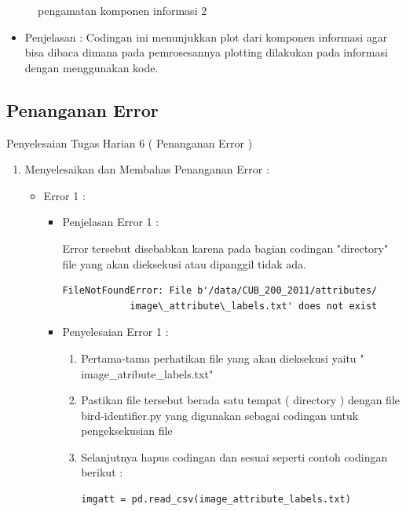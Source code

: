 \begin{enumerate}
\begin{itemize}
\begin{figure}[ht]
\caption{pengamatan komponen informasi 2}
\label{contoh}
\end{figure}
\par
\begin{itemize}
\item Penjelasan : Codingan ini menunjukkan plot dari komponen informasi agar bisa dibaca dimana pada pemrosesannya plotting dilakukan pada informasi dengan menggunakan kode.
\par
\par
\end{itemize}
\end{itemize}


\par
\par
\subsection{Penanganan Error}
Penyelesaian Tugas Harian 6 ( Penanganan Error )
\begin{enumerate}
\item Menyelesaikan dan Membahas Penanganan Error :
\begin{itemize}
\item Error 1 :
\par 
\par
\begin{itemize}
\item Penjelasan Error 1 :
\par Error tersebut disebabkan karena pada bagian codingan "directory" file yang akan dieksekusi atau dipanggil tidak ada.
\begin{lstlisting}
FileNotFoundError: File b'/data/CUB_200_2011/attributes/
			image\_attribute\_labels.txt' does not exist
\end{lstlisting}
\item Penyelesaian Error 1 :
\begin{enumerate}
\item Pertama-tama perhatikan file yang akan dieksekusi yaitu " image\_atribute\_labels.txt" 
\item Pastikan file tersebut berada satu tempat ( directory ) dengan file bird-identifier.py yang digunakan sebagai codingan untuk pengeksekusian file
\item Selanjutnya hapus codingan dan sesuai seperti contoh codingan berikut :
\begin{lstlisting}
imgatt = pd.read_csv(image_attribute_labels.txt)
\end{lstlisting}
\par

\end{enumerate}
\end{itemize}
\end{itemize}
\end{enumerate}
\end{enumerate}
